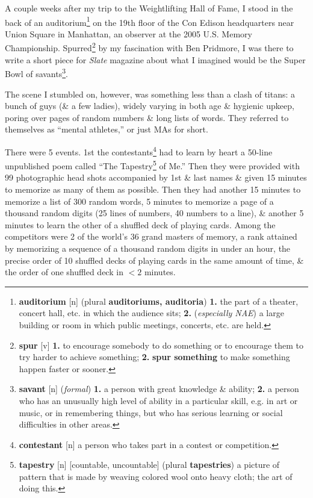 \documentclass[oneside]{book}
\numberwithin{equation}{section}
\begin{document}
A couple weeks after my trip to the Weightlifting Hall of Fame, I stood in the back of an auditorium\footnote{\textbf{auditorium} [n] (plural \textbf{auditoriums, auditoria}) \textbf{1.} the part of a theater, concert hall, etc. in which the audience sits; \textbf{2.} (\textit{especially NAE}) a large building or room in which public meetings, concerts, etc. are held.} on the 19th floor of the Con Edison headquarters near Union Square in Manhattan, an observer at the 2005 U.S. Memory Championship. Spurred\footnote{\textbf{spur} [v] \textbf{1.} to encourage somebody to do something or to encourage them to try harder to achieve something; \textbf{2.} \textbf{spur something} to make something happen faster or sooner.} by my fascination with Ben Pridmore, I was there to write a short piece for \textit{Slate} magazine about what I imagined would be the Super Bowl of savants\footnote{\textbf{savant} [n] (\textit{formal}) \textbf{1.} a person with great knowledge \& ability; \textbf{2.} a person who has an unusually high level of ability in a particular skill, e.g. in art or music, or in remembering things, but who has serious learning or social difficulties in other areas.}.

The scene I stumbled on, however, was something less than a clash of titans: a bunch of guys (\& a few ladies), widely varying in both age \& hygienic upkeep, poring over pages of random numbers \& long lists of words. They referred to themselves as ``mental athletes,'' or just MAs for short.

There were 5 events. 1st the contestants\footnote{\textbf{contestant} [n] a person who takes part in a contest or competition.} had to learn by heart a 50-line unpublished poem called ``The Tapestry\footnote{\textbf{tapestry} [n] [countable, uncountable] (plural \textbf{tapestries}) a picture of pattern that is made by weaving colored wool onto heavy cloth; the art of doing this.} of Me.'' Then they were provided with 99 photographic head shots accompanied by 1st \& last names \& given 15 minutes to memorize as many of them as possible. Then they had another 15 minutes to memorize a list of 300 random words, 5 minutes to memorize a page of a thousand random digits (25 lines of numbers, 40 numbers to a line), \& another 5 minutes to learn the other of a shuffled deck of playing cards. Among the competitors were 2 of the world's 36 grand masters of memory, a rank attained by memorizing a sequence of a thousand random digits in under an hour, the precise order of 10 shuffled decks of playing cards in the same amount of time, \& the order of one shuffled deck in $< 2$ minutes.
\end{document}
